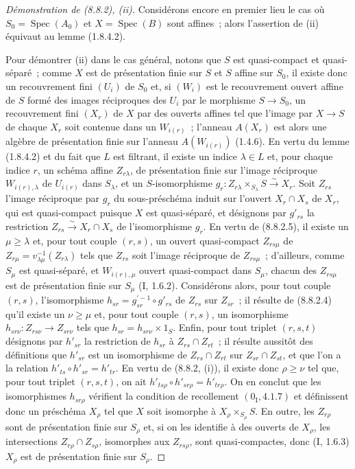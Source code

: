 \begin{proof}[Démonstration de (8.8.2), (ii)]
Considérons encore en premier lieu le cas où $S_0=\operatorname{Spec}(A_0)$ et
$X=\operatorname{Spec}(B)$ sont affines~; alors l'assertion de (ii) équivaut
au lemme (1.8.4.2).

Pour démontrer (ii) dans le cas général, notons que $S$ est quasi-compact et
quasi-séparé~; comme $X$ est de présentation finie sur $S$ et $S$ affine sur
$S_0$, il existe donc un recouvrement fini $(U_i)$ de $S_0$ et, si $(W_i)$ est
le recouvrement ouvert affine de $S$ formé des images réciproques des $U_i$
par le morphisme $S\to S_0$, un recouvrement fini $(X_r)$ de $X$ par des
ouverts affines tel que l'image par $X\to S$ de chaque $X_r$ soit contenue
dans un $W_{i(r)}$~; l'anneau $A(X_r)$ est alors une algèbre de présentation
finie sur l'anneau $A(W_{i(r)})$ (1.4.6). En vertu du lemme (1.8.4.2) et du
fait que $L$ est filtrant, il existe un indice $\lambda\in L$ et, pour chaque
indice $r$, un schéma affine $Z_{r\lambda}$, de présentation finie sur l'image
réciproque $W_{i(r),\lambda}$ de $U_{i(r)}$ dans $S_\lambda$, et un
$S$-isomorphisme
$g_r:Z_{r\lambda}\times_{S_\lambda}S\xrightarrow{\sim}X_r$. Soit $Z_{rs}$
l'image réciproque par $g_r$ du sous-préschéma induit sur l'ouvert
$X_r\cap X_s$ de $X_r$, qui est quasi-compact puisque $X$ est quasi-séparé,
et désignons par $g'_{rs}$ la restriction
$Z_{rs}\xrightarrow{\sim}X_r\cap X_s$ de l'isomorphisme $g_r$. En vertu de
(8.8.2.5), il existe un $\mu\geq\lambda$ et, pour tout couple $(r,s)$, un
ouvert quasi-compact $Z_{rs\mu}$ de
$Z_{r\mu}=v_{\lambda\mu}^{-1}(Z_{r\lambda})$ tels que $Z_{rs}$ soit l'image
réciproque de $Z_{rs\mu}$~; d'ailleurs, comme $S_\mu$ est quasi-séparé, et
$W_{i(r),\mu}$ ouvert quasi-compact dans $S_\mu$, chacun des $Z_{rs\mu}$ est
de présentation finie sur $S_\mu$ (I, 1.6.2). Considérons alors, pour tout
couple $(r,s)$, l'isomorphisme
$h_{sr}=g_{sr}^{'-1}\circ g'_{rs}$ de $Z_{rs}$ sur $Z_{sr}$~; il résulte de
(8.8.2.4) qu'il existe un $\nu\geq\mu$ et, pour tout couple $(r,s)$, un
isomorphisme $h_{sr\nu}:Z_{rs\nu}\to Z_{sr\nu}$ tels que
$h_{sr}=h_{sr\nu}\times1_S$. Enfin, pour tout triplet $(r,s,t)$ désignons par
$h'_{sr}$ la restriction de $h_{sr}$ à
$Z_{rs}\cap Z_{rt}$~; il résulte aussitôt des définitions que $h'_{sr}$ est un
isomorphisme de $Z_{rs}\cap Z_{rt}$ sur $Z_{sr}\cap Z_{st}$, et que l'on a la
relation $h'_{ts}\circ h'_{sr}=h'_{tr}$. En vertu de (8.8.2, (i)), il existe
donc $\rho\geq\nu$ tel que, pour tout triplet $(r,s,t)$, on ait
$h'_{ts\rho}\circ h'_{sr\rho}=h'_{tr\rho}$. On en conclut que les
isomorphismes $h_{sr\rho}$ vérifient la condition de recollement
$(0_{\mathrm I}, 4.1.7)$ et définissent donc un préschéma $X_\rho$ tel que $X$
soit isomorphe à $X_\rho\times_{S_\rho}S$. En outre, les $Z_{r\rho}$ sont de
présentation finie sur $S_\rho$ et, si on les identifie à des ouverts de
$X_\rho$, les intersections $Z_{r\rho}\cap Z_{s\rho}$, isomorphes aux
$Z_{rs\rho}$, sont quasi-compactes, donc (I, 1.6.3) $X_\rho$ est de
présentation finie sur $S_\rho$.
\end{proof}

